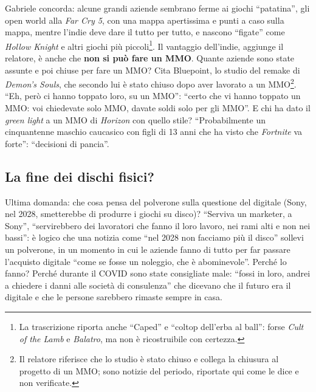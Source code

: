 Gabriele concorda: alcune grandi aziende sembrano ferme ai giochi ``patatina'',
gli open world alla \emph{Far Cry 5}, con una mappa apertissima e punti a caso
sulla mappa, mentre l'indie deve dare il tutto per tutto, e nascono ``figate''
come \emph{Hollow Knight} e altri giochi più piccoli\footnote{La trascrizione
riporta anche ``Caped'' e ``coltop dell'erba al ball'': forse \emph{Cult of the
Lamb} e \emph{Balatro}, ma non è ricostruibile con certezza.}. Il vantaggio
dell'indie, aggiunge il relatore, è anche che \textbf{non si può fare un MMO}.
Quante aziende sono state assunte e poi chiuse per fare un MMO? Cita Bluepoint,
lo studio del remake di \emph{Demon's Souls}, che secondo lui è stato chiuso
dopo aver lavorato a un MMO\footnote{Il relatore riferisce che lo studio è
stato chiuso e collega la chiusura al progetto di un MMO; sono notizie del
periodo, riportate qui come le dice e non verificate.}. ``Eh, però ci hanno
toppato loro, su un MMO'': ``certo che vi hanno toppato un MMO: voi chiedevate
solo MMO, davate soldi solo per gli MMO''. E chi ha dato il \emph{green light}
a un MMO di \emph{Horizon} con quello stile? ``Probabilmente un cinquantenne
maschio caucasico con figli di 13 anni che ha visto che \emph{Fortnite} va
forte'': ``decisioni di pancia''.

\subsection{La fine dei dischi fisici?}

Ultima domanda: che cosa pensa del polverone sulla questione del digitale
(Sony, nel 2028, smetterebbe di produrre i giochi su disco)? ``Serviva un
marketer, a Sony'', ``servirebbero dei lavoratori che fanno il loro lavoro, nei
rami alti e non nei bassi'': è logico che una notizia come ``nel 2028 non
facciamo più il disco'' sollevi un polverone, in un momento in cui le aziende
fanno di tutto per far passare l'acquisto digitale ``come se fosse un noleggio,
che è abominevole''. Perché lo fanno? Perché durante il COVID sono state
consigliate male: ``fossi in loro, andrei a chiedere i danni alle società di
consulenza'' che dicevano che il futuro era il digitale e che le persone
sarebbero rimaste sempre in casa.

